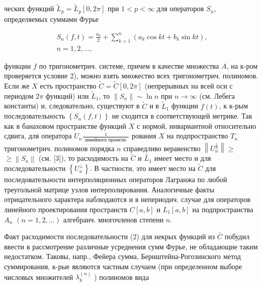 \documentclass[10pt]{article}
\begin{document}
ческих функций $\tilde{L}_{p}=\tilde{L}_{p}[0,2 \pi]$ при $1<p<\infty$ для операторов $S_{n}$, определяемых суммами Фурье



\[

\begin{gathered}

S_{n}(f, t)=\frac{a_{0}}{2}+\sum_{k=1}^{n}\left(a_{k} \cos k t+b_{k} \sin k t\right), \\

n=1,2, \ldots,

\end{gathered}

\]



функции $f$ по тригонометрич. системе, причем в качестве множества $A$, на к-ром проверяется условие 2), можно взять множество всех тригонометрич. полиномов. Если же $X$ есть пространство $\tilde{C}=\tilde{C}[0,2 \pi]$ (непрерывных на всей оси с периодом $2 \pi$ функций) или $\tilde{L}_{1}$, то $\left\|S_{n}\right\| \sim \ln n$ при $n \rightarrow \infty$ (см. Лебега константы) и, следовательно, существуют в $\tilde{C}$ и в $\tilde{L}_{1}$ функции $f(t)$, к к-рым последовательность $\left\{S_{n}(f, t)\right\}$ не сходится в соответствующей метрике. Так как в банаховом пространстве функций $X$ с нормой, инвариантной относительно сдвига, для оператора $U_{n} \frac{1}{\text { линейного проекти- }}$ рования $X$ на подпространство $T_{n}$ тригонометрич. полиномов порядка $n$ справедливо веравенство $\left\|U_{n}^{\frac{1}{n}}\right\| \geqslant$ $\geqslant\left\|S_{n}\right\|$ (см. [3]), то расходимость на $\tilde{C}$ и $\tilde{L_{1}}$ имеет место и для последовательности $\left\{U_{n}^{\perp}\right\}$. В частности, это имеет место на $\tilde{C}$ для последовательности интерполяционных операторов Лагранжа по любой треугольной матрице узлов интерполирования. Аналогичные факты отрицательного характера наблюдаются и в непериодич. случае для операторов линейного проектирования пространств $C[a, b]$ и $L_{1}[a, b]$ на подпространства $A_{n}$ $(n=1,2, \ldots)$ алгебраич. многочленов степени $n$.



Факт расходимости последовательности (2) для некрых функций из $\bar{C}$ побудил ввести в рассмотрение различные усреднения сумм Фурье, не обладающие таким недостатком. Таковы, напр., Фейера сумма, Бернштейна-Рогозинского метод суммирования, к-рые являются частным случаем (при определенном выборе числовых множителей $\lambda_{k}^{(n)}$ ) полиномов вида
\end{document}
